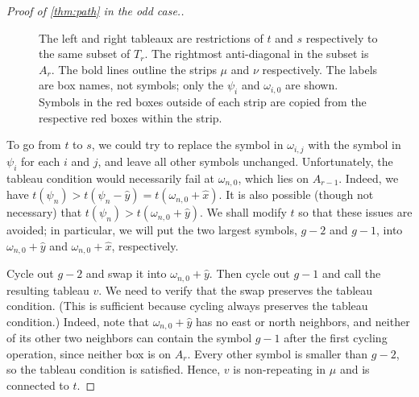 \documentclass[11pt,reqno]{amsart}
\newcommand{\caelan}[1]{\textcolor{orange}{\sf C: [#1]}}
\newcommand{\steven}[1]{\textcolor{pink}{\sf S: [#1]}}
\theoremstyle{definition}
\theoremstyle{problem}
\theoremstyle{plain}
\theoremstyle{remark}
\theoremstyle{theorem}
\numberwithin{equation}{section}
\numberwithin{figure}{section}
\begin{document}
\begin{proof}[Proof of \cref{thm:path} in the odd case.]
  \begin{figure}[htb]
    
    \caption{The left and
      right tableaux are restrictions of $t$ and $s$ respectively to
      the same subset of $T_r$.  The rightmost anti-diagonal in the
      subset is $A_r$.  The bold lines outline the strips
      $\mu$ and $\nu$ respectively.  The labels are box names,
      not symbols; only the $\psi_i$ and $\omega_{i,0}$ are shown.
      Symbols in the red boxes outside of each strip are copied from
      the respective red boxes within the strip.
    }
    \label{fig:pathoddproof}
  \end{figure}

  To go from $t$ to $s$, we could try to
  replace the symbol in $\omega_{i,j}$ with the symbol in $\psi_i$ for
  each $i$ and $j$, and leave all other symbols unchanged.
  Unfortunately, the tableau condition would necessarily fail at
  $\omega_{n,0}$, which lies on $A_{r-1}$.  Indeed, we have
  $t(\psi_n) > t(\psi_n - \hat y) = t(\omega_{n,0}+ \hat x)$.  It is
  also possible (though not necessary) that
  $t(\psi_n) > t(\omega_{n,0} + \hat y)$.  We shall modify $t$ so that
  these issues are avoided; in particular, we will put the two largest
  symbols, $g-2$ and $g-1$, into $\omega_{n,0} + \hat y$ and
  $\omega_{n,0} + \hat x$, respectively.

  Cycle out $g-2$ and swap it into $\omega_{n,0} + \hat y$.  Then
  cycle out $g-1$ and call the resulting tableau $v$.  We need to
  verify that the swap preserves the tableau condition.  (This is
  sufficient because cycling always preserves the tableau condition.)
  Indeed, note that $\omega_{n,0} + \hat y$ has no east or north
  neighbors, and neither of its other two neighbors can contain the
  symbol $g-1$ after the first cycling operation, since neither box is
  on $A_r$.  Every other symbol is smaller than $g-2$, so the tableau
  condition is satisfied.  Hence, $v$ is non-repeating in $\mu$ and is
  connected to $t$.


\end{proof}
\end{document}
